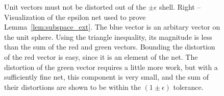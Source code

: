\begin{figure}
{    Unit vectors must not be distorted out of the $\pm \epsilon$ shell. 
    Right – Visualization of the epsilon net used to prove Lemma~\ref{lem:subspace_ext}. 
    The blue vector is an arbitary vector on the unit sphere. 
    Using the triangle inequality, its magnitude is less than the sum of the red and green vectors.
    Bounding the distortion of the red vector is easy,
    since it is an element of the net. 
    The distortion of the green vector requires a little more work, 
    but with a sufficiently fine net, this component is very small,
    and the sum of their distortions are shown to be within the $(1\pm \epsilon)$ tolerance. 
    }
    \label{fig:distortion_and_net}
\end{figure}
